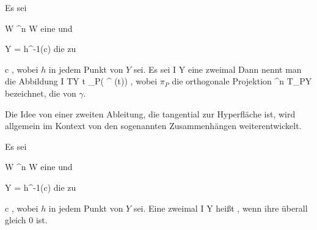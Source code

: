 {}
{

Es sei

\mavergleichskette
{\vergleichskette
{ W
}
{ \subseteq }{ \R^n
}
{  }{
}
{    }{
}
{   }{
}
}
{}{}{}
 { W } { \R
} {}
eine
und

\mavergleichskette
{\vergleichskette
{ Y
}
{ = }{ h^{-1}(c)
}
{  }{
}
{    }{
}
{   }{
}
}
{}{}{}
die
zu

\mavergleichskette
{\vergleichskette
{ c
}
{ \in }{ \R
}
{  }{
}
{    }{
}
{   }{
}
}
{}{}{,}
wobei $h$ in jedem Punkt von $Y$
sei. Es sei
\maabbdisp {\gamma} {I} {Y
} {}
eine
 {} {}
zweimal
Dann nennt man die Abbildung
\maabbeledisp {} {I} { TY
} {t} { \pi_P( \gamma^{\prime \prime} (t))
} {,}
wobei $\pi_P$ die orthogonale Projektion
\maabbdisp {} {\R^n } { T_PY
} {}
bezeichnet, die
 {} {}
von $\gamma$.

}

Die Idee von einer zweiten Ableitung, die tangential zur Hyperfläche ist, wird allgemein im Kontext von den sogenannten Zusammenhängen weiterentwickelt.


{}
{

Es sei

\mavergleichskette
{\vergleichskette
{ W
}
{ \subseteq }{ \R^n
}
{  }{
}
{    }{
}
{   }{
}
}
{}{}{}
 { W } { \R
} {}
eine
und

\mavergleichskette
{\vergleichskette
{ Y
}
{ = }{ h^{-1}(c)
}
{  }{
}
{    }{
}
{   }{
}
}
{}{}{}
die
zu

\mavergleichskette
{\vergleichskette
{ c
}
{ \in }{ \R
}
{  }{
}
{    }{
}
{   }{
}
}
{}{}{,}
wobei $h$ in jedem Punkt von $Y$
sei. Eine
 {} {}
zweimal
\maabbdisp {\gamma} {I} {Y
} {}
heißt
 {} {,}
wenn ihre
überall gleich $0$ ist.

}

